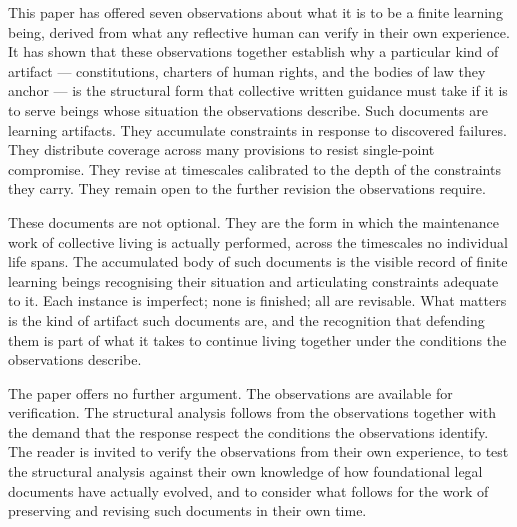 \documentclass[11pt]{article}
\begin{document}
This paper has offered seven observations about what it is to be
a finite learning being, derived from what any reflective human
can verify in their own experience. It has shown that these
observations together establish why a particular kind of artifact
— constitutions, charters of human rights, and the bodies of law
they anchor — is the structural form that collective written
guidance must take if it is to serve beings whose situation the
observations describe. Such documents are learning artifacts.
They accumulate constraints in response to discovered failures.
They distribute coverage across many provisions to resist
single-point compromise. They revise at timescales calibrated to
the depth of the constraints they carry. They remain open to
the further revision the observations require.

These documents are not optional. They are the form in which the
maintenance work of collective living is actually performed,
across the timescales no individual life spans. The accumulated
body of such documents is the visible record of finite learning
beings recognising their situation and articulating constraints
adequate to it. Each instance is imperfect; none is finished;
all are revisable. What matters is the kind of artifact such
documents are, and the recognition that defending them is part
of what it takes to continue living together under the
conditions the observations describe.

The paper offers no further argument. The observations are
available for verification. The structural analysis follows from
the observations together with the demand that the response
respect the conditions the observations identify. The reader is
invited to verify the observations from their own experience, to
test the structural analysis against their own knowledge of how
foundational legal documents have actually evolved, and to
consider what follows for the work of preserving and revising
such documents in their own time.
\end{document}
